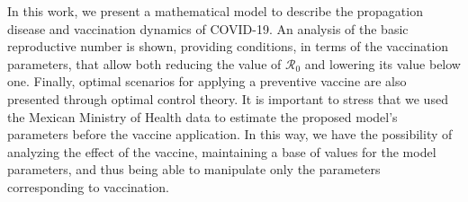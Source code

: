 In this work, we present a mathematical model to describe the propagation disease and vaccination dynamics of COVID-19. An analysis of the basic reproductive number is shown, providing conditions, in terms of the vaccination parameters, that allow both reducing the value of $\mathcal{R}_{0}$ and lowering its value below one. Finally, optimal scenarios for applying a preventive vaccine are also presented through optimal control theory. It is important to stress that we used the Mexican Ministry of Health data to estimate the proposed model's parameters before the vaccine application. In this way, we have the possibility of analyzing the effect of the vaccine, maintaining a base of values for the model parameters, and thus being able to manipulate only the parameters corresponding to vaccination. 

